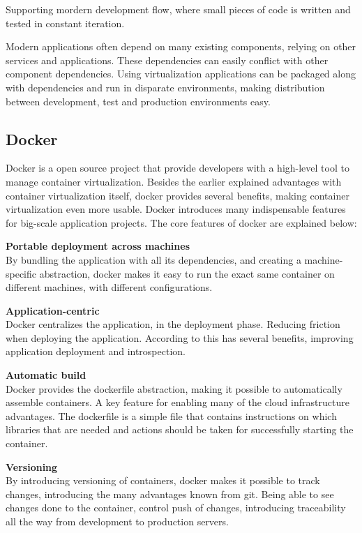 Supporting mordern development flow, where small pieces of code is written and tested in constant iteration\cite{fink2014docker}.

Modern applications often depend on many existing components, relying on other services and applications. These dependencies can easily conflict with other component dependencies\cite{merkel2014docker}. Using virtualization applications can be packaged along with dependencies and run in disparate environments, making distribution between development, test and production environments easy.

\subsection{Docker}
Docker is a open source project that provide developers with a high-level tool to manage container virtualization. Besides the earlier explained advantages with container virtualization itself, docker provides several benefits, making container virtualization even more usable. Docker introduces many indispensable features for big-scale application projects\cite{dockerFAQ}. The core features of docker are explained below:

\textbf{Portable deployment across machines}\\
By bundling the application with all its dependencies, and creating a machine-specific abstraction, docker makes it easy to run the exact same container on different machines, with different configurations.

\textbf{Application-centric}\\
Docker centralizes the application, in the deployment phase. Reducing friction when deploying the application. According to \citeauthor{burns2016borg} this has several benefits, improving application deployment and introspection.

\textbf{Automatic build}\\
Docker provides the dockerfile abstraction, making it possible to automatically assemble containers. A key feature for enabling many of the cloud infrastructure advantages. The dockerfile is a simple file that contains instructions on which libraries that are needed and actions should be taken for successfully starting the container.

\textbf{Versioning}\\
By introducing versioning of containers, docker makes it possible to track changes, introducing the many advantages known from git. Being able to see changes done to the container, control push of changes, introducing traceability all the way from development to production servers.

